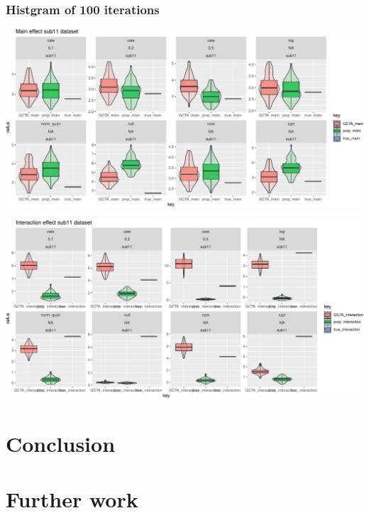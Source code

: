 \documentclass[]{article}
\begin{document}

\clearpage

\subsubsection{Histgram of 100
iterations}\label{histgram-of-100-iterations-2}

\includegraphics{Fixed_effect_simulation_files/figure-latex/sub11_main-1.pdf}

\includegraphics{Fixed_effect_simulation_files/figure-latex/sub11_inter-1.pdf}

\section{Conclusion}\label{conclusion}

\section{Further work}\label{further-work}
\end{document}
